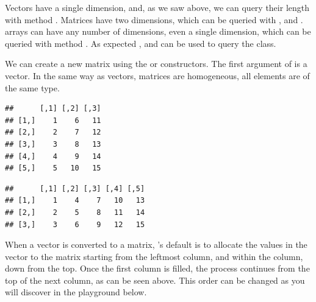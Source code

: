 \documentclass[krantz2]{krantz}\usepackage{knitr}
\begin{document}
Vectors have a single dimension, and, as we saw above, we can query their length with method . Matrices have two dimensions, which can be queried with ,  and . \Rlang arrays can have any number of dimensions, even a single dimension, which can be queried with method . As expected ,  and  can be used to query the class.

We can create a new matrix using the  or  constructors. The first argument of  is a vector. In the same way as vectors, matrices are homogeneous, all elements are of the same type.

\begin{knitrout}\footnotesize
{}\color{fgcolor}\begin{kframe}
\begin{alltt}
\hlstd{(}\hlopt{:}\hlstd{,}  \hlstd{=} \hlstd{)}
\end{alltt}
\begin{verbatim}
##      [,1] [,2] [,3]
## [1,]    1    6   11
## [2,]    2    7   12
## [3,]    3    8   13
## [4,]    4    9   14
## [5,]    5   10   15
\end{verbatim}
\begin{alltt}
\hlstd{(}\hlopt{:}\hlstd{,}  \hlstd{=} \hlstd{)}
\end{alltt}
\begin{verbatim}
##      [,1] [,2] [,3] [,4] [,5]
## [1,]    1    4    7   10   13
## [2,]    2    5    8   11   14
## [3,]    3    6    9   12   15
\end{verbatim}
\end{kframe}
\end{knitrout}

When a vector is converted to a matrix, \Rlang's default is to allocate the values in the vector to the matrix starting from the leftmost column, and within the column, down from the top. Once the first column is filled, the process continues from the top of the next column, as can be seen above. This order can be changed as you will discover in the playground below.
\end{document}
